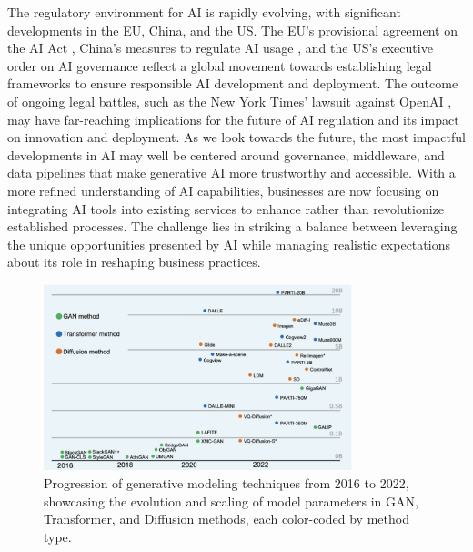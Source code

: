\documentclass[11pt,a4paper,oneside]{report}
\begin{document}
The regulatory environment for AI is rapidly evolving, with significant developments in the EU, China, and the US. 
The EU's provisional agreement on the AI Act \cite{eu_ai_act_2023}, China's measures to regulate AI usage \cite{China_AI_Policy_2023}, and the US's executive order on AI governance \cite{WhiteHouse_AI_ExecOrder_2023} reflect a global movement towards establishing legal frameworks to ensure responsible AI development and deployment. 
The outcome of ongoing legal battles, such as the New York Times' lawsuit against OpenAI \cite{Grynbaum_Mac_2023_Times_Sues_OpenAI}, may have far-reaching implications for the future of AI regulation and its impact on innovation and deployment. 
As we look towards the future, the most impactful developments in AI may well be centered around governance, middleware, and data pipelines that make generative AI more trustworthy and accessible. 
With a more refined understanding of AI capabilities, businesses are now focusing on integrating AI tools into existing services to enhance rather than revolutionize established processes. 
The challenge lies in striking a balance between leveraging the unique opportunities presented by AI while managing realistic expectations about its role in reshaping business practices.

\begin{figure}[htbp]
  \centering
  \includegraphics[width=0.8\textwidth]{models.png}
  \caption{Progression of generative modeling techniques from 2016 to 2022, showcasing the evolution and scaling of model parameters in GAN, Transformer, and Diffusion methods, each color-coded by method type.\cite{bie2023renaissance}}
\end{figure}
\end{document}
